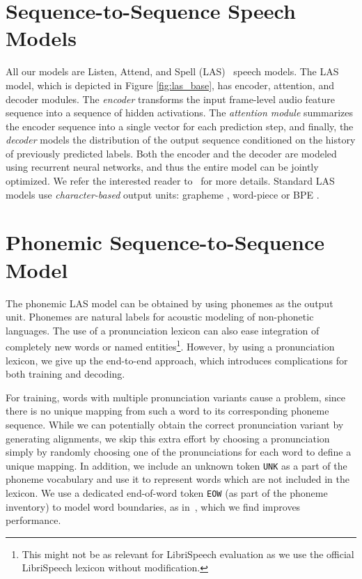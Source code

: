 \documentclass[a4paper]{article}
\begin{document}
\section{Sequence-to-Sequence Speech Models}
\label{sec:model}
All our models are Listen, Attend, and Spell (LAS)~\cite{lasicassp2016} speech models.
The LAS model, which is depicted in Figure \ref{fig:las_base}, has encoder, attention, and decoder modules. The \textit{encoder} transforms the input frame-level audio feature sequence into
a sequence of hidden activations. The \textit{attention module} summarizes the
encoder sequence into a single vector for each prediction step, and finally,
the \textit{decoder} models the distribution of the output sequence conditioned
on the history of previously predicted labels.
Both the encoder and the decoder are modeled using recurrent neural networks,
and thus the entire model can be jointly optimized.
We refer the interested reader to~\cite{lasicassp2016, RPis2017, WeissCJWC17} for more details.
Standard LAS models use \textit{character-based} output units:
grapheme \cite{lasicassp2016}, word-piece \cite{ChiuSWPNCKWRGJL18} or BPE \cite{zeyer2018:asr-attention}.
\vspace{-2mm}
\section{Phonemic Sequence-to-Sequence Model}
\vspace{-1mm}
The phonemic LAS model can be obtained by using phonemes as the output unit.
Phonemes are natural labels for acoustic modeling of non-phonetic languages.
The use of a pronunciation lexicon can also ease integration of
completely new words or named entities\footnote{This might not be as relevant
for LibriSpeech evaluation as we use the official LibriSpeech lexicon without
modification.}\cite{bruguier19}.
However, by using a pronunciation lexicon, we give
up the end-to-end approach, which introduces complications for both training and
decoding.

For training, words with multiple pronunciation variants cause a problem, since
there is no unique mapping from such a word to its corresponding phoneme
sequence.
While we can potentially obtain the correct pronunciation variant by generating
alignments, we skip this extra effort by choosing a pronunciation simply by
randomly choosing one of the pronunciations for each word to define a unique
mapping.
In addition, we include an unknown token \texttt{UNK} as a part of the phoneme vocabulary and
use it to represent words which are not included in the lexicon.
We use a dedicated end-of-word token \texttt{EOW} (as part of the phoneme
inventory) to model word boundaries, as in~\cite{sainath2017no}, which we
find improves performance.
\end{document}
